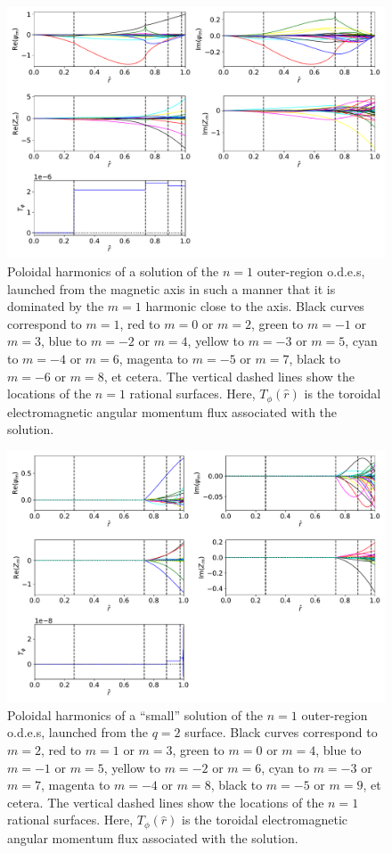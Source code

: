 \documentclass[12pt,prb,aps]{revtex4-1}
\begin{document}
\begin{figure}
\centerline{\includegraphics[width=\textwidth]{Figure5.pdf}}
\caption{Poloidal harmonics of a solution of the $n=1$ outer-region o.d.e.s, launched from the magnetic axis in such a manner that it is dominated by the $m=1$ harmonic close to the axis.
Black curves correspond to $m=1$, red to $m=0$ or $m=2$, green to $m=-1$ or $m=3$, blue to $m=-2$ or $m=4$, yellow to $m=-3$ or $m=5$,
cyan to $m=-4$ or $m=6$, magenta to $m=-5$ or $m=7$, black to $m=-6$ or $m=8$, et cetera. The vertical dashed lines show
the locations of the  $n=1$ rational surfaces. Here, $T_\phi(\hat{r})$ is the toroidal electromagnetic angular momentum 
flux associated with the solution.}\label{f5}
\end{figure}

\begin{figure}
\centerline{\includegraphics[width=\textwidth]{Figure6.pdf}}
\caption{Poloidal harmonics of a ``small'' solution of the $n=1$ outer-region o.d.e.s, launched from the $q=2$ surface.
Black curves correspond to $m=2$, red to $m=1$ or $m=3$, green to $m=0$ or $m=4$, blue to $m=-1$ or $m=5$, yellow to $m=-2$ or $m=6$,
cyan to $m=-3$ or $m=7$, magenta to $m=-4$ or $m=8$, black to $m=-5$ or $m=9$, et cetera. The vertical dashed lines show
the locations of the  $n=1$ rational surfaces. Here, $T_\phi(\hat{r})$ is the toroidal electromagnetic angular momentum 
flux associated with the solution.}\label{f6}
\end{figure}
\end{document}
